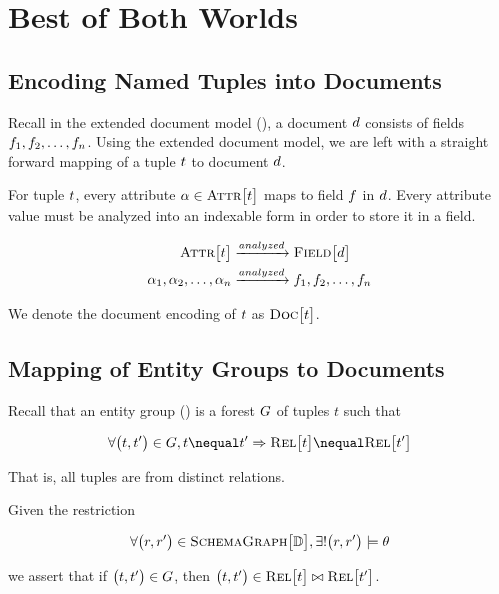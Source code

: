 \chapter{Best of Both Worlds}
    \section{Encoding Named Tuples into Documents}
    \label{sec:named-tuples-documents}
        Recall in the extended document model (), a document $d$ consists of fields $f_1, f_2, \dotsc, f_n$.  Using the extended document model, we are left with a straight forward mapping of a tuple $t$ to document $d$.
        
        For tuple $t$, every attribute $\alpha \in \textsc{Attr}\bigl[t\bigr]$ maps to field $f$ in $d$.  Every attribute value must be analyzed into an indexable form in order to store it in a field.
        
        \begin{align}
            \textsc{Attr}\bigl[t\bigr] &\xrightarrow{analyzed} \textsc{Field}\bigl[d\bigr] \\
            \alpha_1, \alpha_2, \dotsc, \alpha_n &\xrightarrow{analyzed} f_1, f_2, \dotsc, f_n
        \end{align}
        
        We denote the document encoding of $t$ as $\textsc{Doc}\bigl[t\bigr]$.
    
    \section{Mapping of Entity Groups to Documents}
        Recall that an entity group () is a forest $G$ of tuples $t$ such that
        
        \[
            \forall \bigl(\tuple, \tuple'\bigr) \in \egraph, \tuple \nequal \tuple' \Rightarrow \relations{\tuple} \nequal \relations{\tuple'}
        \]
        
        That is, all tuples are from distinct relations.
        
        Given the restriction
        
        \[
            \forall \bigl(r, r'\bigr) \in \textsc{SchemaGraph}\bigl[\mathbb{D}\bigr], \exists! \bigl(r, r'\bigr) \models \theta
        \]
        
        we assert that if $\bigl(t, t'\bigr) \in G$, then $\bigl(t, t'\bigr) \in \textsc{Rel}\bigl[t\bigr] \bowtie \textsc{Rel}\bigl[t'\bigr]$.
        
